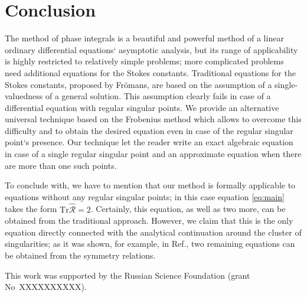 \documentclass[aip,jmp,reprint]{revtex4-1}
\def\R{\widehat{\mathcal{R}}}
\def\Tr{\mathrm{Tr}}
\begin{document}
\section{Conclusion \label{sec:con}}
The method of phase integrals is a beautiful and powerful method of a linear ordinary 
differential equations` asymptotic analysis, but its range of applicability is highly 
restricted to relatively simple problems; more complicated problems need additional equations 
for the Stokes constants. Traditional equations for the Stokes constants, proposed by Fr\"omans\cite{frpaper},
are based on the assumption of a single-valuedness of a general solution. This assumption clearly fails
in case of a differential equation with regular singular points. We provide an alternative universal
technique based on the Frobenius method which allows to overcome this difficulty and to obtain the 
desired equation even in case of the regular singular point`s presence. 
Our technique let the reader write an exact algebraic equation in case
of a single regular singular point and an approximate equation when there are more than one such points.

To conclude with, we have to mention that our method is formally applicable to equations without any regular
singular points; in this case equation \eqref{eq:main} takes the form $\Tr \R = 2$. Certainly, this equation,
as well as two more, can be obtained from the traditional approach. However, we claim that this is the only equation
directly connected with the analytical continuation around the cluster of singularities; as it was shown,
for example, in Ref., two remaining equations can be obtained from the symmetry relations.





\begin{acknowledgments}
This work was supported by the Russian Science Foundation (grant No~XXXXXXXXXX). 
\end{acknowledgments}
\end{document}
